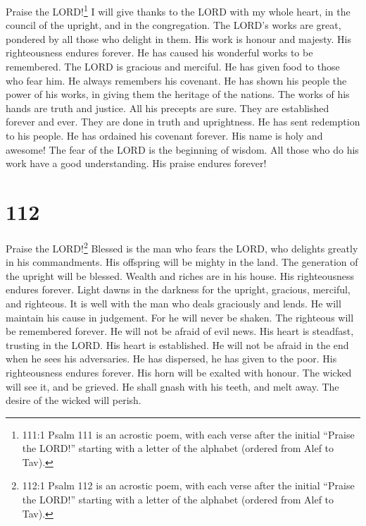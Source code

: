 Praise the LORD!\footnote{111:1 Psalm 111 is an acrostic
  poem, with each verse after the initial ``Praise the LORD!'' starting
  with a letter of the alphabet (ordered from Alef to Tav).} I will give
thanks to the LORD with my whole heart, in the council of the upright,
and in the congregation.  The LORD's works are great,
pondered by all those who delight in them.  His work is
honour and majesty. His righteousness endures forever.  He
has caused his wonderful works to be remembered. The LORD is gracious
and merciful.  He has given food to those who fear him. He
always remembers his covenant.  He has shown his people the
power of his works, in giving them the heritage of the nations.
 The works of his hands are truth and justice. All his
precepts are sure.  They are established forever and ever.
They are done in truth and uprightness.  He has sent
redemption to his people. He has ordained his covenant forever. His name
is holy and awesome!  The fear of the LORD is the beginning
of wisdom. All those who do his work have a good understanding. His
praise endures forever!

\hypertarget{section-104}{%
\section{112}\label{section-104}}

 Praise the LORD!\footnote{112:1 Psalm 112 is an acrostic
  poem, with each verse after the initial ``Praise the LORD!'' starting
  with a letter of the alphabet (ordered from Alef to Tav).} Blessed is
the man who fears the LORD, who delights greatly in his commandments.
 His offspring will be mighty in the land. The generation of
the upright will be blessed.  Wealth and riches are in his
house. His righteousness endures forever.  Light dawns in
the darkness for the upright, gracious, merciful, and righteous.
 It is well with the man who deals graciously and lends. He
will maintain his cause in judgement.  For he will never be
shaken. The righteous will be remembered forever.  He will
not be afraid of evil news. His heart is steadfast, trusting in the
LORD.  His heart is established. He will not be afraid in
the end when he sees his adversaries.  He has dispersed, he
has given to the poor. His righteousness endures forever. His horn will
be exalted with honour.  The wicked will see it, and be
grieved. He shall gnash with his teeth, and melt away. The desire of the
wicked will perish.


